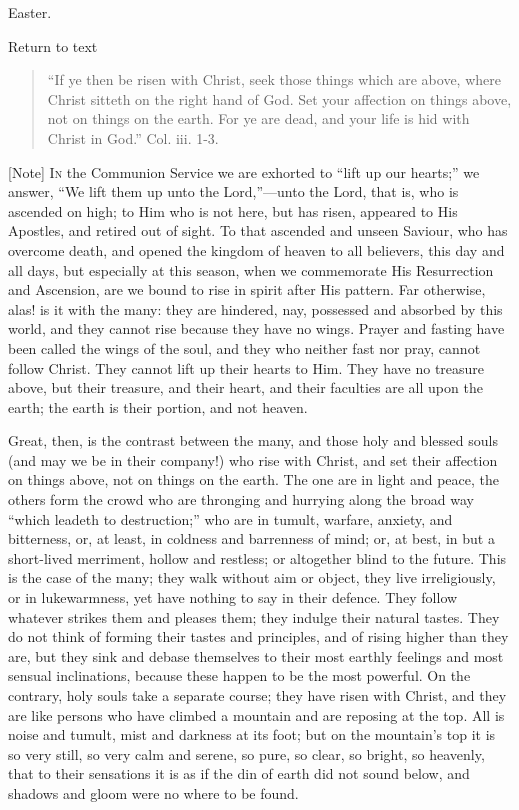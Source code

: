
Easter.

Return to text


\begin{quote}

``If ye then be risen with Christ, seek those things which
are above, where Christ sitteth on the right hand of God. Set your
affection on things above, not on things on the earth. For ye are
dead, and your life is hid with Christ in God.'' Col. iii. 1-3.

\end{quote}

[Note] I\textsc{n} the Communion Service
we are exhorted to ``lift up our hearts;'' we answer, ``We
lift them up unto the Lord,''—unto the Lord, that is, who is
ascended on high; to Him who is not here, but has risen, appeared to
His Apostles, and retired out of sight. To that ascended and unseen
Saviour, who has overcome death, and opened the kingdom of heaven to
all believers, this day and all days, but especially at this season,
when we commemorate His Resurrection and Ascension, are we bound to
rise in spirit after His pattern. Far otherwise, alas! is it with the
many: they are hindered, nay, possessed and absorbed by this world,
and they cannot rise because they have no wings. Prayer and fasting
have been called the wings of the soul, and they who neither fast nor
pray, cannot follow Christ. They cannot lift up their hearts to Him.
They have no treasure above, but their treasure, and their heart, and
their faculties are all upon the earth; the earth is their portion,
and not heaven.

Great, then, is the contrast between the many, and those holy and
blessed souls (and may we be in their company!) who rise with Christ,
and set their affection on things above, not on things on the earth.
The one are in light and peace, the others form the crowd who are
thronging and hurrying along the broad way ``which leadeth to
destruction;'' who are in tumult, warfare, anxiety, and
bitterness, or, at least, in coldness and barrenness of mind; or, at
best, in but a short-lived merriment, hollow and restless; or
altogether blind to the future. This is the case of the many; they
walk without aim or object, they live irreligiously, or in
lukewarmness, yet have nothing to say in their defence. They follow
whatever strikes them and pleases them; they indulge their natural
tastes. They do not think of forming their tastes and principles, and
of rising higher than they are, but they sink and debase themselves to
their most earthly feelings and most sensual inclinations, because
these happen to be the most powerful. On the contrary, holy souls take
a separate course; they have risen with Christ, and they are like
persons who have climbed a mountain and are reposing at the top. All
is noise and tumult, mist and darkness at its foot; but on the
mountain's top it is so very still, so very calm and serene, so pure,
so clear, so bright, so heavenly, that to their sensations it is as if
the din of earth did not sound below, and shadows and gloom were no
where to be found.

